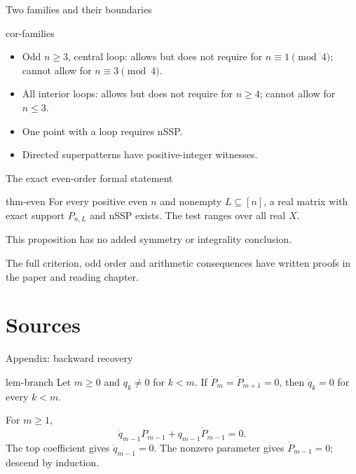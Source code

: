 \documentclass{beamer}
\begin{document}
\begin{frame}{Two families and their boundaries}
\begin{bookresult}{cor-families}
\begin{itemize}
\item Odd $n\geq3$, central loop: allows but does not require for $n\equiv1\pmod4$; cannot allow for $n\equiv3\pmod4$.
\item All interior loops: allows but does not require for $n\geq4$; cannot allow for $n\leq3$.
\item One point with a loop requires nSSP.
\item Directed superpatterns have positive-integer witnesses.
\end{itemize}
\end{bookresult}
\end{frame}

\begin{frame}{The exact even-order formal statement}
\begin{bookresult}{thm-even}
For every positive even $n$ and nonempty $L\subseteq[n]$, a real matrix with exact support $P_{n,L}$ and nSSP exists. The test ranges over all real $X$.
\end{bookresult}
This proposition has no added symmetry or integrality conclusion.
\medskip

The full criterion, odd order and arithmetic consequences have written proofs in the paper and reading chapter.
\end{frame}

\appendix
\section{Sources}
\begin{frame}{Appendix: backward recovery}
\begin{bookresult}{lem-branch}
Let $m\geq0$ and $q_k\ne0$ for $k<m$. If $\dot P_m=\dot P_{m+1}=0$, then $\dot q_k=0$ for every $k<m$.
\end{bookresult}
For $m\geq1$,
\[\dot q_{m-1}P_{m-1}+q_{m-1}\dot P_{m-1}=0.\]
The top coefficient gives $\dot q_{m-1}=0$. The nonzero parameter gives $\dot P_{m-1}=0$; descend by induction.
\end{frame}
\end{document}
